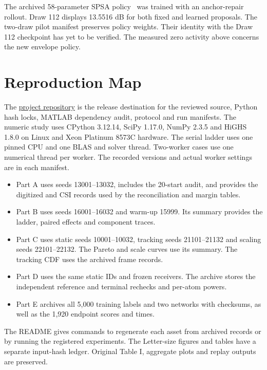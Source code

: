 \documentclass[journal]{IEEEtran}
\begin{document}
The archived 58-parameter SPSA policy~\cite{spall} was trained with an anchor-repair rollout. Draw 112 displays 13.5516 dB for both fixed and learned proposals. The two-draw pilot manifest preserves policy weights. Their identity with the Draw 112 checkpoint has yet to be verified. The measured zero activity above concerns the new envelope policy.

\section{Reproduction Map}
The \href{https://github.com/muneefo/clutter_aware_beamforming-for-ISAC}{project repository} is the release destination for the reviewed source, Python hash locks, MATLAB dependency audit, protocol and run manifests. The numeric study uses CPython 3.12.14, SciPy 1.17.0, NumPy 2.3.5 and HiGHS 1.8.0 on Linux and Xeon Platinum 8573C hardware. The serial ladder uses one pinned CPU and one BLAS and solver thread. Two-worker cases use one numerical thread per worker. The recorded versions and actual worker settings are in each manifest.

\begin{itemize}
\item Part A uses seeds 13001--13032, includes the 20-start audit, and provides the digitized and CSI records used by the reconciliation and margin tables.
\item Part B uses seeds 16001--16032 and warm-up 15999. Its summary provides the ladder, paired effects and component traces.
\item Part C uses static seeds 10001--10032, tracking seeds 21101--21132 and scaling seeds 22101--22132. The Pareto and scale curves use its summary. The tracking CDF uses the archived frame records.
\item Part D uses the same static IDs and frozen receivers. The archive stores the independent reference and terminal rechecks and per-atom powers.
\item Part E archives all 5,000 training labels and two networks with checksums, as well as the 1,920 endpoint scores and times.
\end{itemize}
The README gives commands to regenerate each asset from archived records or by running the registered experiments. The Letter-size figures and tables have a separate input-hash ledger. Original Table I, aggregate plots and replay outputs are preserved.



\end{document}
